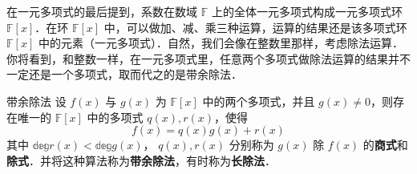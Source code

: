 
在一元多项式的最后提到，系数在数域 $\mathbb{F}$ 上的全体一元多项式构成一元多项式环 $\mathbb{F}[x]$．在环 $\mathbb{F}[x]$ 中，可以做加、减、乘三种运算，运算的结果还是该多项式环 $\mathbb{F}[x]$ 中的元素（一元多项式）．自然，我们会像在整数里那样，考虑除法运算．你将看到，和整数一样，在一元多项式里，任意两个多项式做除法运算的结果并不一定还是一个多项式，取而代之的是带余除法．
\begin{theorem}{带余除法}
设 $f(x)$ 与 $g(x)$ 为 $\mathbb{F}[x]$ 中的两个多项式，并且 $g(x)\neq 0$，则存在唯一的 $\mathbb{F}[x]$ 中的多项式 $q(x),r(x)$，使得
\begin{equation}
f(x)=q(x)g(x)+r(x)
\end{equation}
其中 $\mathbb{deg}r(x)<\mathbb{deg}g(x)$， $q(x),r(x)$ 分别称为 $g(x)$ 除 $f(x)$ 的\textbf{商式}和 \textbf{除式}．并将这种算法称为\textbf{带余除法}，有时称为\textbf{长除法}．
\end{theorem}